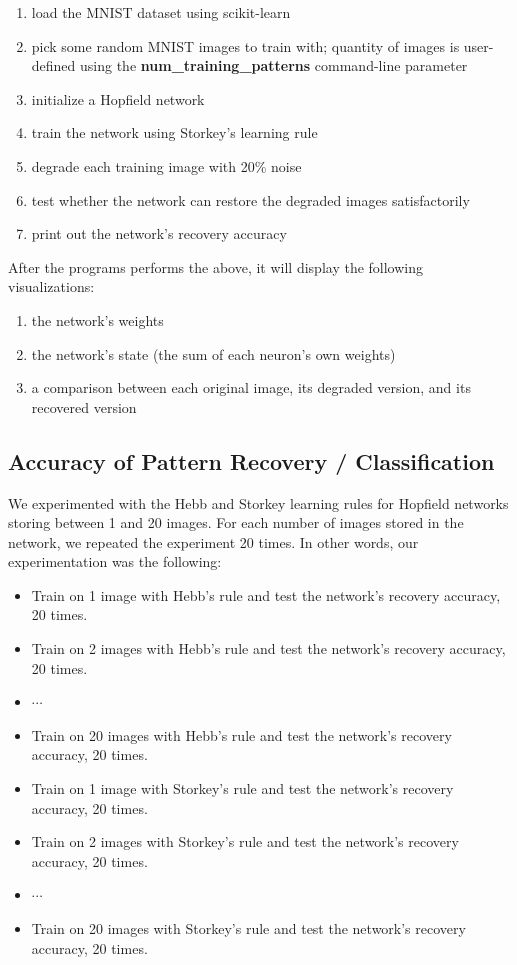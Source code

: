 \documentclass[11pt]{article}
\providecommand{\tightlist}{%
  \setlength{\itemsep}{0pt}\setlength{\parskip}{0pt}}
\begin{document}
\begin{enumerate}
	\def\labelenumi{\arabic{enumi}.}
	\tightlist
	\item
	  load the MNIST dataset using scikit-learn
	\item
	  pick some random MNIST images to train with; quantity of images is
	  user-defined using the \textbf{num\_training\_patterns} command-line
	  parameter
	\item
	  initialize a Hopfield network
	\item
	  train the network using Storkey's learning rule
	\item
	  degrade each training image with 20\% noise
	\item
	  test whether the network can restore the degraded images
	  satisfactorily
	\item
	  print out the network's recovery accuracy
\end{enumerate}

After the programs performs the above, it will display the following
visualizations:

\begin{enumerate}
	\def\labelenumi{\arabic{enumi}.}
	\tightlist
	\item
	  the network's weights
	\item
	  the network's state (the sum of each neuron's own weights)
	\item
	  a comparison between each original image, its degraded version, and
	  its recovered version
\end{enumerate}

\subsection{Accuracy of Pattern Recovery / Classification}\label{accuracy-of-pattern-recovery-classification}

We experimented with the Hebb and Storkey learning rules for Hopfield
networks storing between 1 and 20 images. For each number of images
stored in the network, we repeated the experiment 20 times. In other
words, our experimentation was the following:

\begin{itemize}
\item
  Train on 1 image with Hebb's rule and test the network's
  recovery accuracy, 20 times.
\item
  Train on 2 images with Hebb's rule and test the network's
  recovery accuracy, 20 times.
\item
  \(\cdots\)
\item
  Train on 20 images with Hebb's rule and test the network's
  recovery accuracy, 20 times.
\item
  Train on 1 image with Storkey's rule and test the network's
  recovery accuracy, 20 times.
\item
  Train on 2 images with Storkey's rule and test the network's
  recovery accuracy, 20 times.
\item
  \(\cdots\)
\item
  Train on 20 images with Storkey's rule and test the network's
  recovery accuracy, 20 times.
\end{itemize}
\end{document}

